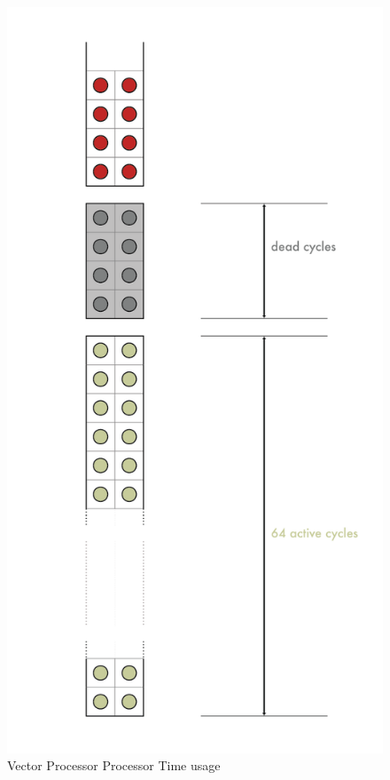 \begin{figure}[H]
    \centering
    \includegraphics[scale = 0.4]{Chapter_1/img/time-usage.png}
    \caption{Vector Processor Processor Time usage~\cite{L15-Krste}}
    \label{Vectoring}
\end{figure}

